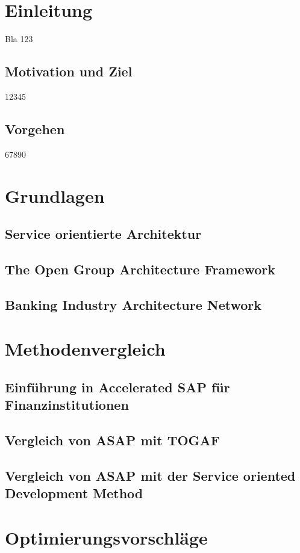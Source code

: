 \chapter{Einleitung}
\label{cha:einleitung}

    Bla 123

    \section{Motivation und Ziel}
    
        12345
    
    \section{Vorgehen}
    
        67890
    
\chapter{Grundlagen}
\label{cha:grundlagen}

    \section{Service orientierte Architektur}
    
    \section{The Open Group Architecture Framework}
    
    \section{Banking Industry Architecture Network}
    
\chapter{Methodenvergleich}
\label{cha:vergleich}

    \section{Einführung in Accelerated SAP für Finanzinstitutionen}
    
    \section{Vergleich von ASAP mit TOGAF}
    
    \section{Vergleich von ASAP mit der Service oriented Development Method}
    
\chapter{Optimierungsvorschläge}
\label{cha:optimierung}
